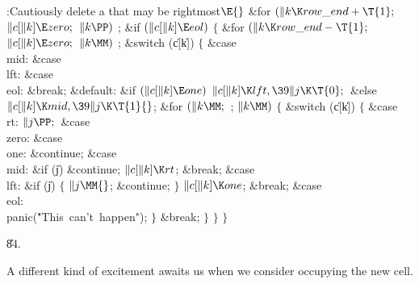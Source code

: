 \B{}:Cautiously delete a  that may be
rightmost\X${}\E{}$\6
\&{for} ${}(\|k\K\\{row\_end}+\T{1};{}$ ${}\|c[\|k]\E\\{zero};{}$ ${}\|k\PP){}$%
\1\5
;\2\6
\&{if} ${}(\|c[\|k]\E\\{eol}){}$\5
${}\{{}$\1\6
\&{for} ${}(\|k\K\\{row\_end}-\T{1};{}$ ${}\|c[\|k]\E\\{zero};{}$ ${}\|k\MM){}$%
\1\5
;\2\6
\&{switch} (\|c[\|k])\5
${}\{{}$\1\6
\4\&{case} \\{mid}:\5
\&{case} \\{lft}:\5
\&{case} \\{eol}:\5
\&{break};\6
\4\&{default}:\5
\&{if} ${}(\|c[\|k]\E\\{one}){}$\1\5
${}\|c[\|k]\K\\{lft},\39\|j\K\T{0};{}$\2\6
\&{else}\1\5
${}\|c[\|k]\K\\{mid},\39\|j\K\T{1}{}$;\2\6
\&{for} ${}(\|k\MM;{}$  ; ${}\|k\MM){}$\5
${}\{{}$\1\6
\&{switch} (\|c[\|k])\5
${}\{{}$\1\6
\4\&{case} \\{rt}:\5
${}\|j\PP;{}$\6
\4\&{case} \\{zero}:\5
\&{case} \\{one}:\5
\&{continue};\6
\4\&{case} \\{mid}:\5
\&{if} (\|j)\1\5
\&{continue};\2\6
${}\|c[\|k]\K\\{rt}{}$;\5
\&{break};\6
\4\&{case} \\{lft}:\5
\&{if} (\|j)\5
${}\{{}$\5
\1${}\|j\MM{}$;\5
\&{continue};\5
${}\}{}$\2\6
${}\|c[\|k]\K\\{one}{}$;\5
\&{break};\6
\4\&{case} \\{eol}:\5
\\{panic}(\.{"This\ can't\ happen"});\6
\4${}\}{}$\2\6
\&{break};\6
\4${}\}{}$\2\6
\4${}\}{}$\2\6
\4${}\}{}$\2\par
\U84.\fi

A different kind of excitement awaits us when we consider
occupying the new cell.


